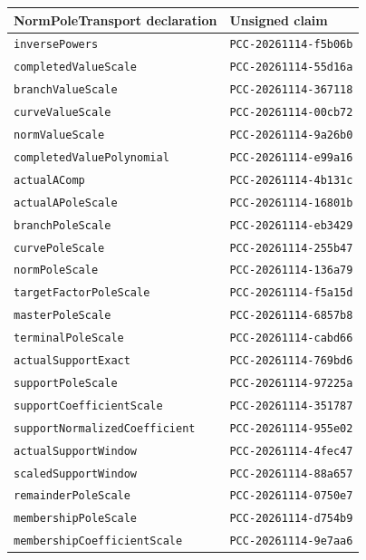 \documentclass[
  10pt,
]{article}
\begin{document}
\begin{longtable}[]{@{}ll@{}}
\toprule\noalign{}
NormPoleTransport declaration & Unsigned claim \\
\midrule\noalign{}
\endhead
\bottomrule\noalign{}
\endlastfoot
\texttt{inversePowers} & \texttt{PCC-20261114-f5b06b} \\
\texttt{completedValueScale} & \texttt{PCC-20261114-55d16a} \\
\texttt{branchValueScale} & \texttt{PCC-20261114-367118} \\
\texttt{curveValueScale} & \texttt{PCC-20261114-00cb72} \\
\texttt{normValueScale} & \texttt{PCC-20261114-9a26b0} \\
\texttt{completedValuePolynomial} & \texttt{PCC-20261114-e99a16} \\
\texttt{actualAComp} & \texttt{PCC-20261114-4b131c} \\
\texttt{actualAPoleScale} & \texttt{PCC-20261114-16801b} \\
\texttt{branchPoleScale} & \texttt{PCC-20261114-eb3429} \\
\texttt{curvePoleScale} & \texttt{PCC-20261114-255b47} \\
\texttt{normPoleScale} & \texttt{PCC-20261114-136a79} \\
\texttt{targetFactorPoleScale} & \texttt{PCC-20261114-f5a15d} \\
\texttt{masterPoleScale} & \texttt{PCC-20261114-6857b8} \\
\texttt{terminalPoleScale} & \texttt{PCC-20261114-cabd66} \\
\texttt{actualSupportExact} & \texttt{PCC-20261114-769bd6} \\
\texttt{supportPoleScale} & \texttt{PCC-20261114-97225a} \\
\texttt{supportCoefficientScale} & \texttt{PCC-20261114-351787} \\
\texttt{supportNormalizedCoefficient} & \texttt{PCC-20261114-955e02} \\
\texttt{actualSupportWindow} & \texttt{PCC-20261114-4fec47} \\
\texttt{scaledSupportWindow} & \texttt{PCC-20261114-88a657} \\
\texttt{remainderPoleScale} & \texttt{PCC-20261114-0750e7} \\
\texttt{membershipPoleScale} & \texttt{PCC-20261114-d754b9} \\
\texttt{membershipCoefficientScale} & \texttt{PCC-20261114-9e7aa6} \\
\end{longtable}
\end{document}
